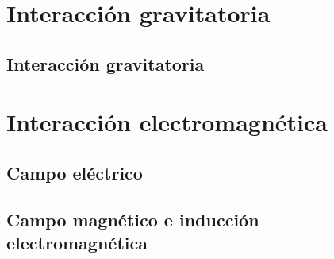 \documentclass[
    11pt, %
    a4paper, %
]{LegrandOrangeBookES}
\begin{document}
    

    \newpage

    


    \part{Interacción gravitatoria}

    \chapter{Interacción gravitatoria}

    

    \newpage

    


    \part{Interacción electromagnética}

    \chapter{Campo eléctrico}

    

    \newpage

    


    \chapter{Campo magnético e inducción electromagnética}
\end{document}
